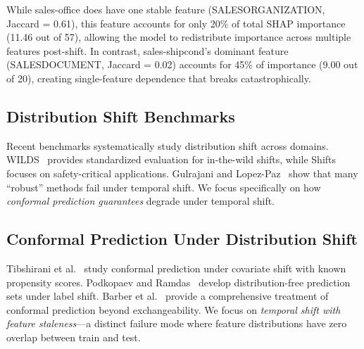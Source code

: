 While sales-office does have one stable feature (SALESORGANIZATION, Jaccard = 0.61),
this feature accounts for only 20\% of total SHAP importance (11.46 out of 57),
allowing the model to redistribute importance across multiple features post-shift.
In contrast, sales-shipcond's dominant feature (SALESDOCUMENT, Jaccard = 0.02)
accounts for 45\% of importance (9.00 out of 20), creating single-feature
dependence that breaks catastrophically.


\caption{Feature Overlap for Primary Features. Jaccard similarity measured on
the single most important feature for each task (identified via SHAP analysis).
Overall model robustness depends on \textit{all} top features, not just the
primary one---see Section 4.4 for analysis of top-5 feature dynamics.}



\subsection{Distribution Shift Benchmarks}

Recent benchmarks systematically study distribution shift across domains.
WILDS~\cite{koh2021wilds} provides standardized evaluation for in-the-wild shifts,
while Shifts~\cite{malinin2021shifts} focuses on safety-critical applications.
Gulrajani and Lopez-Paz~\cite{gulrajani2020search} show that many ``robust''
methods fail under temporal shift. We focus specifically on how
\textit{conformal prediction guarantees} degrade under temporal shift.

\subsection{Conformal Prediction Under Distribution Shift}

Tibshirani et al.~\cite{tibshirani2019conformal} study conformal prediction
under covariate shift with known propensity scores. Podkopaev and
Ramdas~\cite{podkopaev2021distribution} develop distribution-free prediction
sets under label shift. Barber et al.~\cite{barber2023conformal} provide a
comprehensive treatment of conformal prediction beyond exchangeability.
We focus on \textit{temporal shift with feature staleness}---a distinct failure
mode where feature distributions have zero overlap between train and test.

